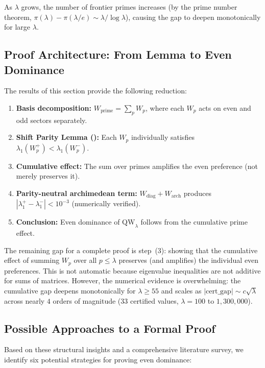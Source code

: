 \documentclass[12pt,a4paper]{article}
\theoremstyle{definition}
\theoremstyle{remark}
\begin{document}
As $\lambda$ grows, the number of frontier primes increases (by the prime number theorem, $\pi(\lambda) - \pi(\lambda/e) \sim \lambda/\log\lambda$), causing the gap to deepen monotonically for large $\lambda$.

\subsection{Proof Architecture: From Lemma to Even Dominance}

The results of this section provide the following reduction:

\begin{enumerate}
  \item \textbf{Basis decomposition:} $W_{\mathrm{prime}} = \sum_p W_p$, where each $W_p$ acts on even and odd sectors separately.
  \item \textbf{Shift Parity Lemma ():} Each $W_p$ individually satisfies $\lambda_1(W_p^+) < \lambda_1(W_p^-)$.
  \item \textbf{Cumulative effect:} The sum over primes amplifies the even preference (not merely preserves it).
  \item \textbf{Parity-neutral archimedean term:} $W_{\mathrm{diag}} + W_{\mathrm{arch}}$ produces $|\lambda_1^+ - \lambda_1^-| < 10^{-3}$ (numerically verified).
  \item \textbf{Conclusion:} Even dominance of $\mathrm{QW}_\lambda$ follows from the cumulative prime effect.
\end{enumerate}

\noindent The remaining gap for a complete proof is step~(3): showing that the cumulative effect of summing $W_p$ over all $p \leq \lambda$ preserves (and amplifies) the individual even preferences. This is not automatic because eigenvalue inequalities are not additive for sums of matrices. However, the numerical evidence is overwhelming: the cumulative gap deepens monotonically for $\lambda \geq 55$ and scales as $|\mathrm{cert\_gap}| \sim c\sqrt{\lambda}$ across nearly $4$ orders of magnitude ($33$ certified values, $\lambda = 100$ to $1{,}300{,}000$).

\subsection{Possible Approaches to a Formal Proof}

Based on these structural insights and a comprehensive literature survey, we identify six potential strategies for proving even dominance:
\end{document}
